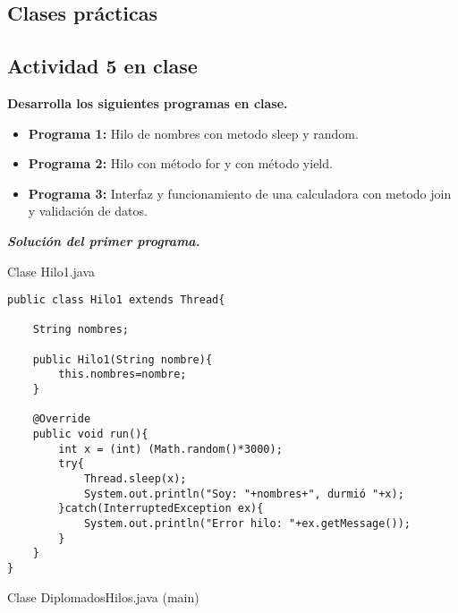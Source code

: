 
\begin{center}
\section{Clases prácticas}
\end{center}

{\raggedright
\subsection{Actividad 5 en clase}
}\vspace{.5cm}

\textbf{Desarrolla los siguientes programas en clase.}\vspace{.2mm}

\begin{itemize}
\item \textbf{Programa 1:} Hilo de nombres con metodo sleep y random.
\item \textbf{Programa 2:} Hilo con método for y con método yield.
\item \textbf{Programa 3:} Interfaz y funcionamiento de una calculadora con metodo join y validación de datos.
\end{itemize}\vspace{.5cm}

\textbf{\textit{Solución del primer programa.}}

\begin{center}
Clase Hilo1.java
\end{center}

\begin{verbatim}
public class Hilo1 extends Thread{
    
    String nombres;
    
    public Hilo1(String nombre){
        this.nombres=nombre;
    }
    
    @Override
    public void run(){
        int x = (int) (Math.random()*3000);
        try{
            Thread.sleep(x);
            System.out.println("Soy: "+nombres+", durmió "+x);
        }catch(InterruptedException ex){
            System.out.println("Error hilo: "+ex.getMessage());
        }
    }
}
\end{verbatim} \vspace{1cm}

\begin{center}
Clase DiplomadosHilos.java (main)
\end{center}

